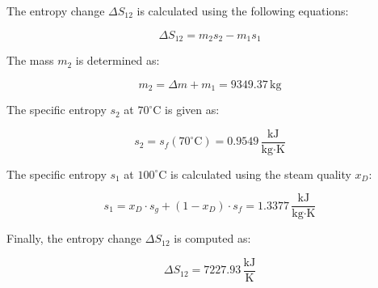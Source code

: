 The entropy change \( \Delta S_{12} \) is calculated using the following equations:

\[
\Delta S_{12} = m_2 s_2 - m_1 s_1
\]

The mass \( m_2 \) is determined as:

\[
m_2 = \Delta m + m_1 = 9349.37 \, \text{kg}
\]

The specific entropy \( s_2 \) at \( 70^\circ\text{C} \) is given as:

\[
s_2 = s_f(70^\circ\text{C}) = 0.9549 \, \frac{\text{kJ}}{\text{kg·K}}
\]

The specific entropy \( s_1 \) at \( 100^\circ\text{C} \) is calculated using the steam quality \( x_D \):

\[
s_1 = x_D \cdot s_g + (1 - x_D) \cdot s_f = 1.3377 \, \frac{\text{kJ}}{\text{kg·K}}
\]

Finally, the entropy change \( \Delta S_{12} \) is computed as:

\[
\Delta S_{12} = 7227.93 \, \frac{\text{kJ}}{\text{K}}
\]